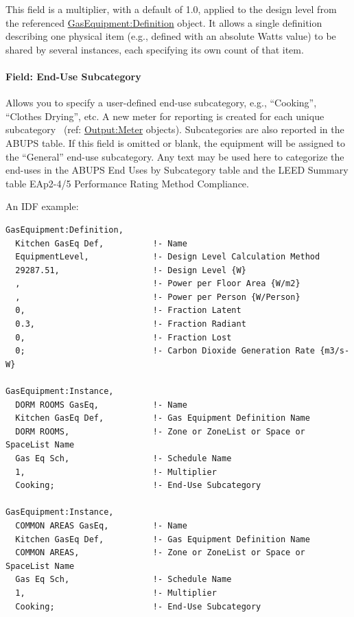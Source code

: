 This field is a multiplier, with a default of 1.0, applied to the design level from the referenced \hyperref[gasequipmentdefinition]{GasEquipment:Definition} object. It allows a single definition describing one physical item (e.g., defined with an absolute Watts value) to be shared by several instances, each specifying its own count of that item.

\paragraph{Field: End-Use Subcategory}\label{field-end-use-subcategory-2-001-gas-instance}

Allows you to specify a user-defined end-use subcategory, e.g., ``Cooking'', ``Clothes Drying'', etc. A new meter for reporting is created for each unique subcategory~ (ref: \hyperref[outputmeter-and-outputmetermeterfileonly]{Output:Meter} objects). Subcategories are also reported in the ABUPS table. If this field is omitted or blank, the equipment will be assigned to the ``General'' end-use subcategory. Any text may be used here to categorize the end-uses in the ABUPS End Uses by Subcategory table and the LEED Summary table EAp2-4/5 Performance Rating Method Compliance.

An IDF example:

\begin{lstlisting}
GasEquipment:Definition,
  Kitchen GasEq Def,          !- Name
  EquipmentLevel,             !- Design Level Calculation Method
  29287.51,                   !- Design Level {W}
  ,                           !- Power per Floor Area {W/m2}
  ,                           !- Power per Person {W/Person}
  0,                          !- Fraction Latent
  0.3,                        !- Fraction Radiant
  0,                          !- Fraction Lost
  0;                          !- Carbon Dioxide Generation Rate {m3/s-W}

GasEquipment:Instance,
  DORM ROOMS GasEq,           !- Name
  Kitchen GasEq Def,          !- Gas Equipment Definition Name
  DORM ROOMS,                 !- Zone or ZoneList or Space or SpaceList Name
  Gas Eq Sch,                 !- Schedule Name
  1,                          !- Multiplier
  Cooking;                    !- End-Use Subcategory

GasEquipment:Instance,
  COMMON AREAS GasEq,         !- Name
  Kitchen GasEq Def,          !- Gas Equipment Definition Name
  COMMON AREAS,               !- Zone or ZoneList or Space or SpaceList Name
  Gas Eq Sch,                 !- Schedule Name
  1,                          !- Multiplier
  Cooking;                    !- End-Use Subcategory
\end{lstlisting}

